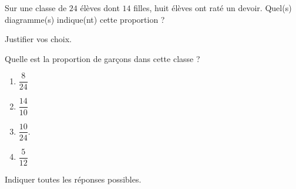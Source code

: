 
\begin{exercice}\label{exosmath-0903}

    Sur une classe de \( 24\) élèves dont \( 14\) filles, huit élèves ont raté un devoir. Quel(s) diagramme(s) indique(nt) cette proportion ?

\begin{center}



\end{center}
Justifier vos choix.

Quelle est la proportion de garçons dans cette classe ?
\begin{multicols}{4}
    \begin{enumerate}
        \item
            \( \dfrac{ 8 }{ 24 }\)
        \item
            \( \dfrac{ 14 }{ 10 }\)
        \item
            \( \dfrac{ 10 }{ 24 }\).
        \item
            \( \dfrac{ 5 }{ 12 }\)
    \end{enumerate}
\end{multicols}
Indiquer toutes les réponses possibles.


\end{exercice}
